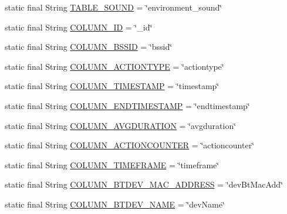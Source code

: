 \begin{DoxyCompactItemize}
\item 
static final String \hyperlink{classcs_1_1nsense_1_1db_1_1_n_sense_s_q_lite_helper_a65318f615866f1180c84e186fa05641a}{T\-A\-B\-L\-E\-\_\-\-S\-O\-U\-N\-D} = \char`\"{}environment\-\_\-sound\char`\"{}
\item 
static final String \hyperlink{classcs_1_1nsense_1_1db_1_1_n_sense_s_q_lite_helper_a42c92e67b4392524cb4f6bf4c4da4c79}{C\-O\-L\-U\-M\-N\-\_\-\-I\-D} = \char`\"{}\-\_\-id\char`\"{}
\item 
static final String \hyperlink{classcs_1_1nsense_1_1db_1_1_n_sense_s_q_lite_helper_a77bf9398c7f26a154ab4fc248df87f55}{C\-O\-L\-U\-M\-N\-\_\-\-B\-S\-S\-I\-D} = \char`\"{}bssid\char`\"{}
\item 
static final String \hyperlink{classcs_1_1nsense_1_1db_1_1_n_sense_s_q_lite_helper_a4c4a857f8054a2172b2a7f2857787c20}{C\-O\-L\-U\-M\-N\-\_\-\-A\-C\-T\-I\-O\-N\-T\-Y\-P\-E} = \char`\"{}actiontype\char`\"{}
\item 
static final String \hyperlink{classcs_1_1nsense_1_1db_1_1_n_sense_s_q_lite_helper_a37a51662ad91359cdc1218f20e1de3b1}{C\-O\-L\-U\-M\-N\-\_\-\-T\-I\-M\-E\-S\-T\-A\-M\-P} = \char`\"{}timestamp\char`\"{}
\item 
static final String \hyperlink{classcs_1_1nsense_1_1db_1_1_n_sense_s_q_lite_helper_a68730f905d374511aa5caf74f9ee728e}{C\-O\-L\-U\-M\-N\-\_\-\-E\-N\-D\-T\-I\-M\-E\-S\-T\-A\-M\-P} = \char`\"{}endtimestamp\char`\"{}
\item 
static final String \hyperlink{classcs_1_1nsense_1_1db_1_1_n_sense_s_q_lite_helper_a00ad71140d9af9a9f820992793244221}{C\-O\-L\-U\-M\-N\-\_\-\-A\-V\-G\-D\-U\-R\-A\-T\-I\-O\-N} = \char`\"{}avgduration\char`\"{}
\item 
static final String \hyperlink{classcs_1_1nsense_1_1db_1_1_n_sense_s_q_lite_helper_a0a8906d703a22bdcad7fe68cff136c2c}{C\-O\-L\-U\-M\-N\-\_\-\-A\-C\-T\-I\-O\-N\-C\-O\-U\-N\-T\-E\-R} = \char`\"{}actioncounter\char`\"{}
\item 
static final String \hyperlink{classcs_1_1nsense_1_1db_1_1_n_sense_s_q_lite_helper_a54046eeaa614b1a4dd715f2d9891401e}{C\-O\-L\-U\-M\-N\-\_\-\-T\-I\-M\-E\-F\-R\-A\-M\-E} = \char`\"{}timeframe\char`\"{}
\item 
static final String \hyperlink{classcs_1_1nsense_1_1db_1_1_n_sense_s_q_lite_helper_a66d760b81948efc86eafb0bb5147c2a5}{C\-O\-L\-U\-M\-N\-\_\-\-B\-T\-D\-E\-V\-\_\-\-M\-A\-C\-\_\-\-A\-D\-D\-R\-E\-S\-S} = \char`\"{}dev\-Bt\-Mac\-Add\char`\"{}
\item 
static final String \hyperlink{classcs_1_1nsense_1_1db_1_1_n_sense_s_q_lite_helper_aa5c997c964929bd8d27ae424aec82f4d}{C\-O\-L\-U\-M\-N\-\_\-\-B\-T\-D\-E\-V\-\_\-\-N\-A\-M\-E} = \char`\"{}dev\-Name\char`\"{}

\end{DoxyCompactItemize}
